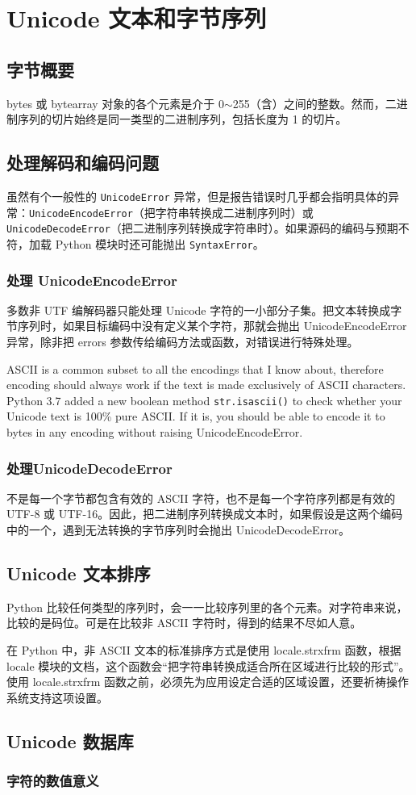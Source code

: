 \chapter{Unicode 文本和字节序列\label{Ch04}}
\section{字节概要}
bytes 或 bytearray 对象的各个元素是介于 0$\sim$255（含）之间的整数。然而，二进制序列的切片始终是同一类型的二进制序列，包括长度为 1 的切片。
\section{处理解码和编码问题}
虽然有个一般性的 \verb|UnicodeError| 异常，但是报告错误时几乎都会指明具体的异常：\verb|UnicodeEncodeError|（把字符串转换成二进制序列时）或 \verb|UnicodeDecodeError|（把二进制序列转换成字符串时）。如果源码的编码与预期不符，加载 Python 模块时还可能抛出 \verb|SyntaxError|。
\subsection{处理 UnicodeEncodeError}
多数非 UTF 编解码器只能处理 Unicode 字符的一小部分子集。把文本转换成字节序列时，如果目标编码中没有定义某个字符，那就会抛出 UnicodeEncodeError 异常，除非把 errors 参数传给编码方法或函数，对错误进行特殊处理。

ASCII is a common subset to all the encodings that I know about, therefore encoding should always work if the text is made exclusively of ASCII characters. Python 3.7 added a new boolean method \verb|str.isascii()| to check whether your Unicode text is 100\% pure ASCII. If it is, you should be able to encode it to bytes in any encoding without raising UnicodeEncodeError.

\subsection{处理UnicodeDecodeError}
不是每一个字节都包含有效的 ASCII 字符，也不是每一个字符序列都是有效的 UTF-8 或 UTF-16。因此，把二进制序列转换成文本时，如果假设是这两个编码中的一个，遇到无法转换的字节序列时会抛出 UnicodeDecodeError。

\section{Unicode 文本排序}
Python 比较任何类型的序列时，会一一比较序列里的各个元素。对字符串来说，比较的是码位。可是在比较非 ASCII 字符时，得到的结果不尽如人意。

在 Python 中，非 ASCII 文本的标准排序方式是使用 locale.strxfrm 函数，根据 locale 模块的文档，这个函数会“把字符串转换成适合所在区域进行比较的形式”。使用 locale.strxfrm 函数之前，必须先为应用设定合适的区域设置，还要祈祷操作系统支持这项设置。
\subsection{}

\section{Unicode 数据库}
\subsection{字符的数值意义}

